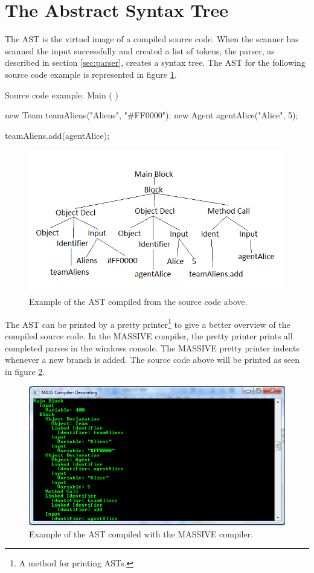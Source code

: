 \section{The Abstract Syntax Tree}
\label{AST}
The AST is the virtuel image of a compiled source code. When the scanner has scanned the input successfully and created a list of tokens, the parser, as described in section \ref{sec:parser}, creates a syntax tree. The AST for the following source code example is represented in figure \ref{fig:astexample}.

\begin{source}{Source code example.}{}
Main (  )
{	
	new Team teamAliens("Aliens", "#FF0000");
	new Agent agentAlice("Alice", 5);
	
	teamAliens.add(agentAlice);	
}
\end{source} 

\begin{figure}[H]
\begin{center}
\includegraphics[scale=0.8]{Images/ASTexample.png}
\end{center}
\caption{Example of the AST compiled from the source code above.}
\label{fig:astexample}
\end{figure}

The AST can be printed by a pretty printer\footnote{A method for printing ASTs.} to give a better overview of the compiled source code. In the MASSIVE compiler, the pretty printer prints all completed parses in the windows console. The MASSIVE pretty printer indents whenever a new branch is added. The source code above will be printed as seen in figure \ref{fig:astmasexample}.

\begin{figure}[H]
\begin{center}
\includegraphics[scale=0.7]{Images/ASTMASexample.png}
\end{center}
\caption{Example of the AST compiled with the MASSIVE compiler.}
\label{fig:astmasexample}
\end{figure}